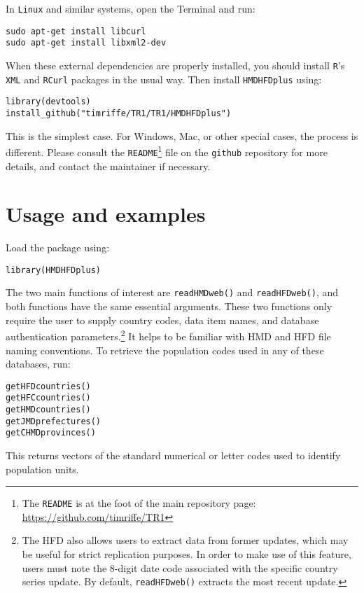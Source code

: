\documentclass{article}
\begin{document}
In \texttt{Linux} and similar systems, open the Terminal and run:
\begin{verbatim}
sudo apt-get install libcurl
sudo apt-get install libxml2-dev
\end{verbatim}
When these external dependencies are properly installed, you should install
\texttt{R}'s \texttt{XML} and \texttt{RCurl} packages in the usual way. Then install \texttt{HMDHFDplus} using:
\begin{verbatim}
library(devtools)
install_github("timriffe/TR1/TR1/HMDHFDplus")
\end{verbatim}
This is the simplest case. For Windows, Mac, or other special cases, the process
is different. Please consult the
\texttt{README}\footnote{The \texttt{README} is at the
foot of the main repository
page: \url{https://github.com/timriffe/TR1}} file on the
\texttt{github} repository for more details, and contact the maintainer if
necessary. 

\section{Usage and examples}
Load the package using:
\begin{verbatim}
library(HMDHFDplus)
\end{verbatim}
The two main functions of interest are \texttt{readHMDweb()} and
\texttt{readHFDweb()}, and both functions have the same essential
arguments. These two functions only require the user to supply country codes,
data item names, and database authentication parameters.\footnote{The HFD also
allows users to extract data from former updates, which may be useful for
strict replication purposes. In order to make use of this feature, users must
note the 8-digit date code associated with the specific country series
update. By default, \texttt{readHFDweb()} extracts the most recent update.} It
helps to be familiar with HMD and HFD file naming conventions. To retrieve the population codes used in any of
these databases, run:
\begin{verbatim}
getHFDcountries()
getHFCcountries()
getHMDcountries()
getJMDprefectures()
getCHMDprovinces()
\end{verbatim}
This returns vectors of the standard numerical or letter codes used to identify
population units. 
\end{document}
